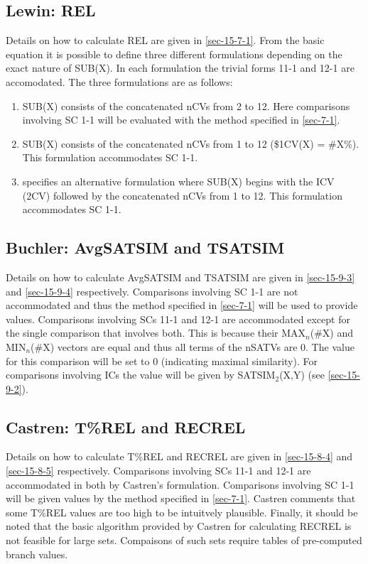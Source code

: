 \documentclass{article}
\begin{document}
\subsection{Lewin: REL}
\label{sec-7-3}

Details on how to calculate REL are given in \ref{sec-15-7-1}. From the basic
equation it is possible to define three different formulations
depending on the exact nature of SUB(X). In each formulation the
trivial forms 11-1 and 12-1 are accomodated. The three formulations
are as follows:
\begin{enumerate}
\item SUB(X) consists of the concatenated nCVs from 2 to 12. Here
   comparisons involving SC 1-1 will be evaluated with the method
   specified in \ref{sec-7-1}.
\item SUB(X) consists of the concatenated nCVs from 1 to 12 (\$1CV(X) =
   \#X\%). This formulation accommodates SC 1-1.
\item \citet{Martorell2013} specifies an alternative formulation where
   SUB(X) begins with the ICV (2CV) followed by the concatenated nCVs
   from 1 to 12. This formulation accommodates SC 1-1.
\end{enumerate}
\subsection{Buchler: AvgSATSIM and TSATSIM}
\label{sec-7-4}

Details on how to calculate AvgSATSIM and TSATSIM are given in
\ref{sec-15-9-3} and \ref{sec-15-9-4} respectively. Comparisons involving SC 1-1 are
not accommodated and thus the method specified in \ref{sec-7-1} will
be used to provide values. Comparisons involving SCs 11-1 and 12-1 are
accommodated except for the single comparison that involves both. This
is because their MAX$_{n}$(\#X) and MIN$_{n}$(\#X) vectors are equal and
thus all terms of the nSATVs are 0. The value for this comparison will
be set to 0 (indicating maximal similarity). For comparisons involving
ICs the value will be given by SATSIM$_{2}$(X,Y) (see \ref{sec-15-9-2}).
\subsection{Castren: T\%REL and RECREL}
\label{sec-7-5}

Details on how to calculate T\%REL and RECREL are given in \ref{sec-15-8-4} and
\ref{sec-15-8-5} respectively. Comparisons involving SCs 11-1 and 12-1 are
accommodated in both by Castren's formulation. Comparisons involving
SC 1-1 will be given values by the method specified in \ref{sec-7-1}. Castren comments that some T\%REL values are too high to be
intuitvely plausible. Finally, it should be noted that the basic
algorithm provided by Castren for calculating RECREL is not feasible
for large sets. Compaisons of such sets require tables of pre-computed
branch values.
\end{document}
